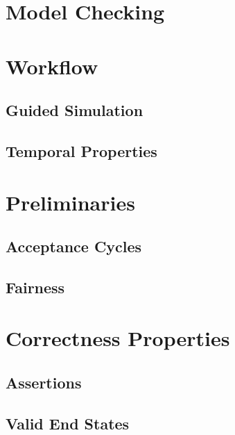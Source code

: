 \documentclass[a4paper, 11pt, accentcolor = tud3b]{tudreport}
\begin{document}
		\section{Model Checking} %

		\section{Workflow} %

			\subsection{Guided Simulation} %

			\subsection{Temporal Properties} %

		\section{Preliminaries} %

			\subsection{Acceptance Cycles} %

			\subsection{Fairness} %

		\section{Correctness Properties} %

			\subsection{Assertions} %

			\subsection{Valid End States} %
\end{document}
